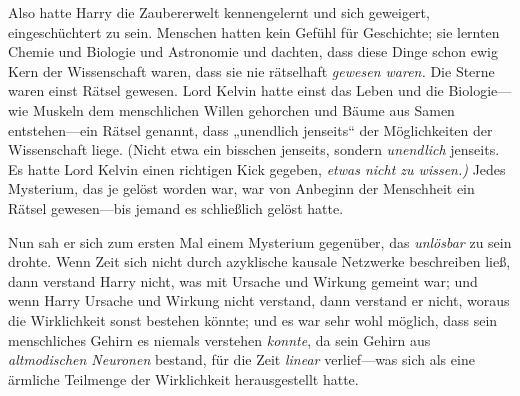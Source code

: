 Also hatte Harry die Zaubererwelt kennengelernt und sich geweigert, eingeschüchtert zu sein. Menschen hatten kein Gefühl für Geschichte; sie lernten Chemie und Biologie und Astronomie und dachten, dass diese Dinge schon ewig Kern der Wissenschaft waren, dass sie nie rätselhaft \emph{gewesen waren.} Die Sterne waren einst Rätsel gewesen. Lord Kelvin hatte einst das Leben und die Biologie—wie Muskeln dem menschlichen Willen gehorchen und Bäume aus Samen entstehen—ein Rätsel genannt, dass „unendlich jenseits“ der Möglichkeiten der Wissenschaft liege. (Nicht etwa ein bisschen jenseits, sondern \emph{unendlich} jenseits. Es hatte Lord Kelvin einen richtigen Kick gegeben, \emph{etwas nicht zu wissen.)} Jedes Mysterium, das je gelöst worden war, war von Anbeginn der Menschheit ein Rätsel gewesen—bis jemand es schließlich gelöst hatte.

Nun sah er sich zum ersten Mal einem Mysterium gegenüber, das \emph{unlösbar} zu sein drohte. Wenn Zeit sich nicht durch azyklische kausale Netzwerke beschreiben ließ, dann verstand Harry nicht, was mit Ursache und Wirkung gemeint war; und wenn Harry Ursache und Wirkung nicht verstand, dann verstand er nicht, woraus die Wirklichkeit sonst bestehen könnte; und es war sehr wohl möglich, dass sein menschliches Gehirn es niemals verstehen \emph{konnte}, da sein Gehirn aus \emph{altmodischen Neuronen} bestand, für die Zeit \emph{linear} verlief—was sich als eine ärmliche Teilmenge der Wirklichkeit herausgestellt hatte.

